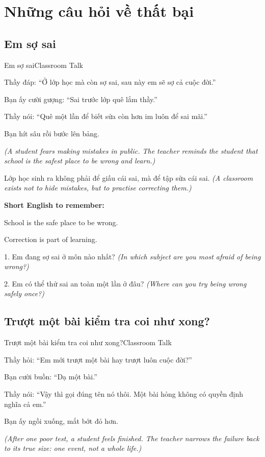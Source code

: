 \chapter{Những câu hỏi về thất bại}

\section{Em sợ sai}
\begin{truyen}{Em sợ sai}{Classroom Talk}

Thầy đáp: ``Ở lớp học mà còn sợ sai, sau này em sẽ sợ cả cuộc đời.''

Bạn ấy cười gượng: ``Sai trước lớp quê lắm thầy.''

Thầy nói: ``Quê một lần để biết sửa còn hơn im luôn để sai mãi.''

Bạn hít sâu rồi bước lên bảng.

\textit{(A student fears making mistakes in public. The teacher reminds the student that school is the safest place to be wrong and learn.)}
\end{truyen}

\begin{baihoc}
Lớp học sinh ra không phải để giấu cái sai, mà để tập sửa cái sai.
\textit{(A classroom exists not to hide mistakes, but to practise correcting them.)}
\end{baihoc}

\begin{ghinhoanh}
\textbf{Short English to remember:}

School is the safe place to be wrong.

Correction is part of learning.
\end{ghinhoanh}

\begin{tuhocnhanh}
1. Em đang sợ sai ở môn nào nhất? \textit{(In which subject are you most afraid of being wrong?)}

2. Em có thể thử sai an toàn một lần ở đâu? \textit{(Where can you try being wrong safely once?)}
\end{tuhocnhanh}
\ngancach

\section{Trượt một bài kiểm tra coi như xong?}
\begin{truyen}{Trượt một bài kiểm tra coi như xong?}{Classroom Talk}

Thầy hỏi: ``Em mới trượt một bài hay trượt luôn cuộc đời?''

Bạn cười buồn: ``Dạ một bài.''

Thầy nói: ``Vậy thì gọi đúng tên nó thôi. Một bài hỏng không có quyền định nghĩa cả em.''

Bạn ấy ngồi xuống, mắt bớt đỏ hơn.

\textit{(After one poor test, a student feels finished. The teacher narrows the failure back to its true size: one event, not a whole life.)}
\end{truyen}

